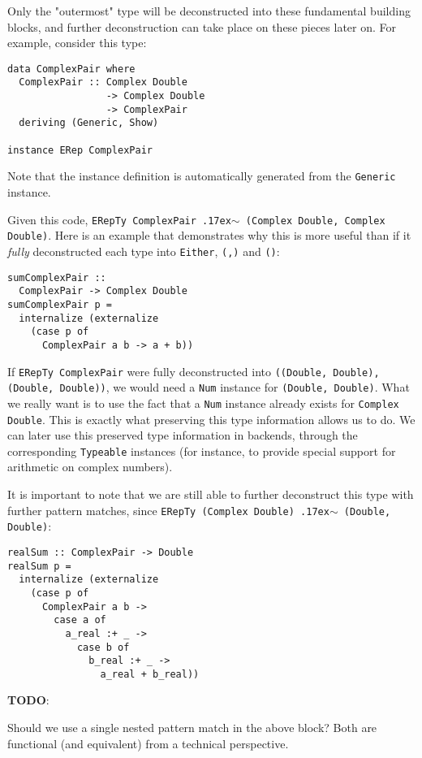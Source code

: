 \documentclass[sigplan,anonymous,review]{acmart}
\newcommand{\typeeq}{\raise.17ex\hbox{$\scriptstyle\mathtt{\sim}$}\,\;}
\newcommand{\ttt}{\texttt}
\newenvironment{todo}
  {\begin{tcolorbox}
   \textbf{TODO}:
  }
  {\end{tcolorbox}
  }
\begin{document}
Only the "outermost" type will be deconstructed into these fundamental building
blocks, and further deconstruction can take place on these pieces later on. For
example, consider this type:

\begin{lstlisting}
data ComplexPair where
  ComplexPair :: Complex Double
                 -> Complex Double
                 -> ComplexPair
  deriving (Generic, Show)

instance ERep ComplexPair
\end{lstlisting}

Note that the instance definition is automatically generated from the
\ttt{Generic} instance.

Given this code, \ttt{ERepTy ComplexPair \typeeq (Complex Double, Complex Double)}. Here
is an example that demonstrates why this is more useful than if it \textit{fully} deconstructed
each type into \ttt{Either}, \ttt{(,)} and \ttt{()}:

\begin{lstlisting}
sumComplexPair ::
  ComplexPair -> Complex Double
sumComplexPair p =
  internalize (externalize
    (case p of
      ComplexPair a b -> a + b))
\end{lstlisting}

If \ttt{ERepTy ComplexPair} were fully deconstructed into \ttt{((Double, Double),
(Double, Double))}, we would need a \ttt{Num} instance for \ttt{(Double,
Double)}.  What we really want is to use the fact that a \ttt{Num} instance
already exists for \ttt{Complex Double}. This is exactly what preserving this
type information allows us to do. We can later use this preserved type
information in backends, through the corresponding \ttt{Typeable} instances (for
instance, to provide special support for arithmetic on complex numbers).

It is important to note that we are still able to further deconstruct this type
with further pattern matches, since \ttt{ERepTy (Complex Double) \typeeq (Double, Double)}:

\begin{lstlisting}
realSum :: ComplexPair -> Double
realSum p =
  internalize (externalize
    (case p of
      ComplexPair a b ->
        case a of
          a_real :+ _ ->
            case b of
              b_real :+ _ ->
                a_real + b_real))
\end{lstlisting}

\begin{todo}
  Should we use a single nested pattern match in the above block? Both
  are functional (and equivalent) from a technical perspective.
\end{todo}
\end{document}
